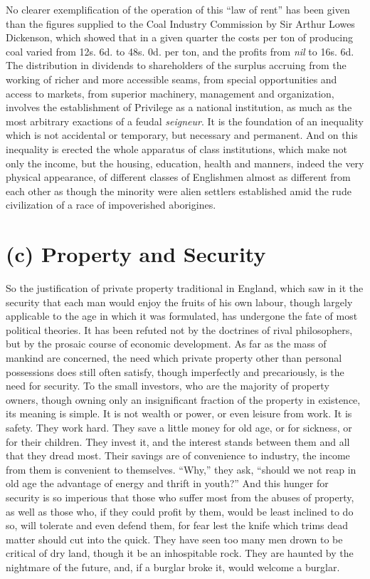 \documentclass{book}
\begin{document}
No clearer exemplification of the operation of this “law of rent” has been given than the figures supplied to the Coal Industry Commission by Sir Arthur Lowes Dickenson, which showed that in a given quarter the costs per ton of producing coal varied from 12s. 6d. to 48s. 0d. per ton, and the profits from \emph{nil} to 16s. 6d. The distribution in dividends to shareholders of the surplus accruing from the working of richer and more accessible seams, from special opportunities and access to markets, from superior machinery, management and organization, involves the establishment of Privilege as a national institution, as much as the most arbitrary exactions of a feudal \emph{seigneur}. It is the foundation of an inequality which is not accidental or temporary, but necessary and permanent. And on this inequality is erected the whole apparatus of class institutions, which make not only the income, but the housing, education, health and manners, indeed the very physical appearance, of different classes of Englishmen almost as different from each other as though the minority were alien settlers established amid the rude civilization of a race of impoverished aborigines.

\section{(c) Property and Security}
So the justification of private property traditional in England, which saw in it the security that each man would enjoy the fruits of his own labour, though largely applicable to the age in which it was formulated, has undergone the fate of most political theories. It has been refuted not by the doctrines of rival philosophers, but by the prosaic course of economic development. As far as the mass of mankind are concerned, the need which private property other than personal possessions does still often satisfy, though imperfectly and precariously, is the need for security. To the small investors, who are the majority of property owners, though owning only an insignificant fraction of the property in existence, its meaning is simple. It is not wealth or power, or even leisure from work. It is safety. They work hard. They save a little money for old age, or for sickness, or for their children. They invest it, and the interest stands between them and all that they dread most. Their savings are of convenience to industry, the income from them is convenient to themselves. “Why,” they ask, “should we not reap in old age the advantage of energy and thrift in youth?” And this hunger for security is so imperious that those who suffer most from the abuses of property, as well as those who, if they could profit by them, would be least inclined to do so, will tolerate and even defend them, for fear lest the knife which trims dead matter should cut into the quick. They have seen too many men drown to be critical of dry land, though it be an inhospitable rock. They are haunted by the nightmare of the future, and, if a burglar broke it, would welcome a burglar.
\end{document}
